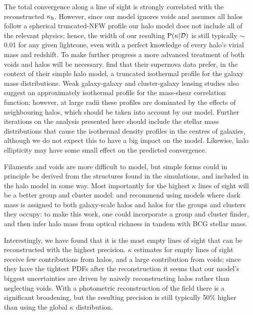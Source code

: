 \documentclass[useAMS,usenatbib]{mn2e}
\begin{document}
The total convergence along a line of sight is strongly correlated with the
reconstructed $\kappa_{\rm h}$. However, since our model ignores voids and assumes
all halos follow a spherical truncated-NFW profile our halo model does not
include all of the relevant physics; hence, the width of our resulting
${\rm P}(\kappa|{\mathcal{D}})$ is still typically $\sim$0.01 for any given lightcone,
even with a perfect knowledge of every halo's virial mass and redshift. To
make further progress a more advanced treatment of both voids and halos will
be necessary. \citet{KarpenkaEtal2012} find that their supernova data prefer,
in the context of their simple halo model, a truncated isothermal profile for
the galaxy mass distributions. Weak galaxy-galaxy and cluster-galaxy  lensing
studies \citep[\eg][]{GavazziEtal2006,JohnstonEtal2007} also suggest an
approximately isothermal profile for the mass-shear correlation function;
however, at large radii these profiles are dominated by the effects of
neighbouring halos, which should be taken into account by our model. Further
iterations on the analysis presented here should include the stellar mass
distributions that cause the isothermal density profiles in the centres of
galaxies, although we do not expect this to have a big impact on the model.
Likewise,  halo ellipticity may have some small effect on the predicted
convergence. 

Filaments and voids are more difficult to model, but simple forms could in
principle be derived from the structures found in the simulations, and
included in the halo model in some way. Most importantly for the highest
$\kappa$ lines of sight will be a better group and cluster model:
\citet{MomchevaEtal2006} and  \citet{WongEtal2011} recommend using models
where dark mass is assigned to both galaxy-scale halos and halos for the
groups and clusters they occupy: to make this work, one could incorporate  a
group and cluster finder, and then infer halo mass from optical richness
\citep[\eg][]{MaxBCG} in tandem with BCG stellar mass.

Interestingly, we have found that it is the most empty lines of sight that 
can be reconstructed with the highest precision. $\kappa$ estimates for empty
lines of sight receive few contributions from halos, and a large contribution
from voids; since they have the tightest PDFs after the reconstruction it
seems that our model's biggest uncertainties are driven by naively
reconstructing halos rather than neglecting voids. With a photometric
reconstruction of the field there is a significant broadening, but the
resulting precision is still typically 50\%  higher than using the global
$\kappa$ distribution. 
\end{document}
